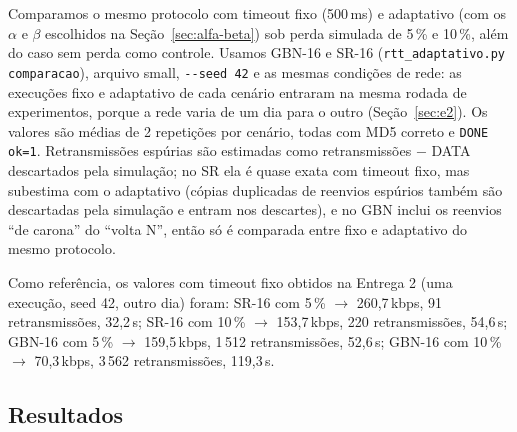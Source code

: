 \documentclass[11pt,a4paper]{article}
\newcommand{\cod}[1]{\textcolor{codverde}{\texttt{\small #1}}}
\begin{document}
Comparamos o mesmo protocolo com timeout fixo (500\,ms) e adaptativo (com os $\alpha$ e $\beta$
escolhidos na Seção~\ref{sec:alfa-beta}) sob perda simulada de 5\,\% e 10\,\%, além do caso sem
perda como controle. Usamos GBN-16 e SR-16 (\cod{rtt\_adaptativo.py comparacao}), arquivo small,
\cod{-{}-seed 42} e as mesmas condições de rede: as execuções fixo e adaptativo de cada cenário
entraram na mesma rodada de experimentos, porque a rede varia de um dia para o outro
(Seção~\ref{sec:e2}). Os valores são médias de 2 repetições por cenário, todas com MD5 correto e
\cod{DONE ok=1}. Retransmissões espúrias são estimadas como retransmissões $-$ DATA descartados pela
simulação; no SR ela é quase exata com timeout fixo, mas subestima com o adaptativo (cópias duplicadas
de reenvios espúrios também são descartadas pela simulação e entram nos descartes), e no GBN inclui os
reenvios ``de carona'' do ``volta N'', então só é comparada entre fixo e adaptativo do mesmo protocolo.

Como referência, os valores com timeout fixo obtidos na Entrega 2 (uma execução, seed 42, outro dia)
foram: SR-16 com 5\,\% $\rightarrow$ 260,7\,kbps, 91 retransmissões, 32,2\,s; SR-16 com 10\,\%
$\rightarrow$ 153,7\,kbps, 220 retransmissões, 54,6\,s; GBN-16 com 5\,\% $\rightarrow$ 159,5\,kbps,
1\,512 retransmissões, 52,6\,s; GBN-16 com 10\,\% $\rightarrow$ 70,3\,kbps, 3\,562 retransmissões,
119,3\,s.

\subsection{Resultados}
\end{document}
